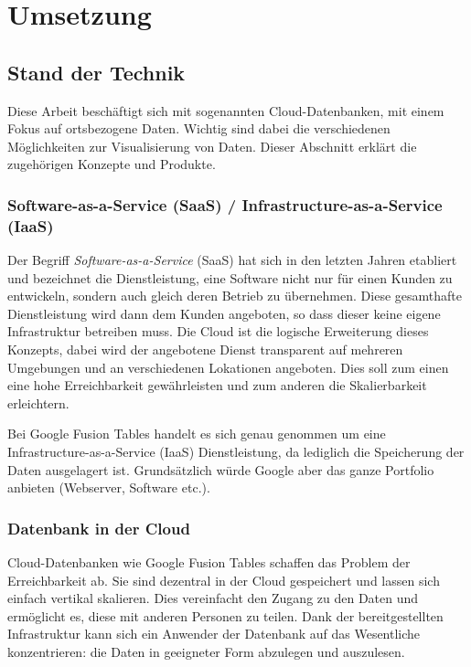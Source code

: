 \chapter{Umsetzung}
\label{umsetzung}

\section{Stand der Technik}
Diese Arbeit beschäftigt sich mit sogenannten \gls{Cloud}-Datenbanken, mit einem Fokus auf ortsbezogene Daten. Wichtig sind dabei die verschiedenen Möglichkeiten zur Visualisierung von Daten. Dieser Abschnitt erklärt die zugehörigen Konzepte und Produkte.

\subsection{Software-as-a-Service (SaaS) / Infrastructure-as-a-Service (IaaS)}
Der Begriff \emph{Software-as-a-Service} (\gls{SaaS}) hat sich in den letzten Jahren etabliert und bezeichnet die Dienstleistung, eine Software nicht nur für einen Kunden zu entwickeln, sondern auch gleich deren Betrieb zu übernehmen. Diese gesamthafte Dienstleistung wird dann dem Kunden angeboten, so dass dieser keine eigene Infrastruktur betreiben muss. Die \gls{Cloud} ist die logische  Erweiterung dieses Konzepts, dabei wird der angebotene Dienst transparent auf mehreren Umgebungen und an verschiedenen Lokationen angeboten. Dies soll zum einen eine hohe Erreichbarkeit gewährleisten und zum anderen die Skalierbarkeit erleichtern.\cite{cloud}

Bei Google Fusion Tables handelt es sich genau genommen um eine Infrastructure-as-a-Service (IaaS) Dienstleistung\cite{service-models}, da lediglich die Speicherung der Daten ausgelagert ist. Grundsätzlich würde Google aber das ganze Portfolio anbieten (Webserver,  Software etc.).

\subsection{Datenbank in der Cloud}
\gls{Cloud}-Datenbanken wie Google Fusion Tables schaffen das Problem der Erreichbarkeit ab. Sie sind dezentral in der \gls{Cloud} gespeichert und lassen sich  einfach vertikal skalieren. Dies vereinfacht den Zugang zu den Daten und ermöglicht es, diese mit anderen Personen zu teilen. Dank der bereitgestellten Infrastruktur kann sich ein Anwender der Datenbank auf das Wesentliche konzentrieren: die Daten in geeigneter Form abzulegen und auszulesen.

